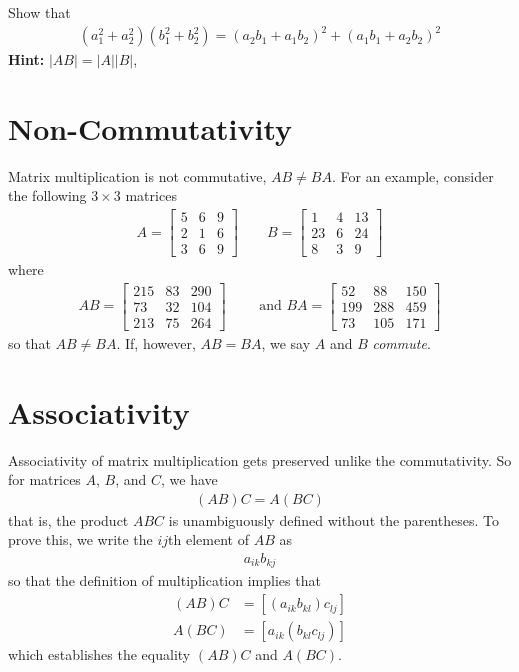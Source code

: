 \begin{homework}
	Show that 
	\begin{align}
		\left(a_1^2 + a_2^2\right)\left(b_1^2 + b_2^2\right) = \left(a_2 b_1 + a_1 b_2\right)^2 + \left(a_1 b_1 + a_2 b_2\right)^2
	\end{align}
	\textbf{Hint:}  $|A B | = |A| |B|$, 
\end{homework}

\section{Non-Commutativity}

Matrix multiplication is not commutative, \ie $AB \neq BA$. For an example, consider the following $3\times3$ matrices
%
\begin{align}
	A = \begin{bmatrix}
	5 & 6 & 9 \\
	2 & 1  & 6 \\
	3 & 6 & 9
	\end{bmatrix} 
	\qquad 
	B = \begin{bmatrix}
	1   &  4  &  13 \\
	23  &   6  &  24 \\
	8   &  3    & 9
	\end{bmatrix} 
\end{align}
%
where
%
\begin{align}
	AB = \begin{bmatrix}
	215  &  83 &  290 \\
	73  &  32 &  104 \\
	213  &  75 &  264
	\end{bmatrix} 
	\qquad
	\text{ and }
	BA = \begin{bmatrix}
	52   & 88  & 150 \\
	199 &  288 &  459 \\
	73 &  105 &  171
	\end{bmatrix} 
\end{align}
%
so that $AB \neq BA$. If, however, $AB = BA$, we say $A$ and $B$ \textit{commute}.

\section{Associativity}
Associativity of matrix multiplication gets preserved unlike the commutativity. So for matrices $A$, $B$, and $C$, we have
%
\begin{align}
	\left(AB\right)C = A\left(BC\right)
\end{align}
%
that is, the product $ABC$ is unambiguously defined without the parentheses. To prove this, we write the $ij$th element of $AB$ as 
%
\begin{align}
	a_{ik} b_{kj}
\end{align} 
%
so that the definition of multiplication implies that 
%
\begin{align}
	\left(AB\right) C &= \left[\left(a_{ik} b_{kl} \right)c_{lj}\right] \\
	A \left(BC\right) & = \left[a_{ik}\left( b_{kl} c_{lj} \right)\right]
\end{align}
%
which establishes the equality $\left(AB\right) C$ and $A \left(BC\right)$.

